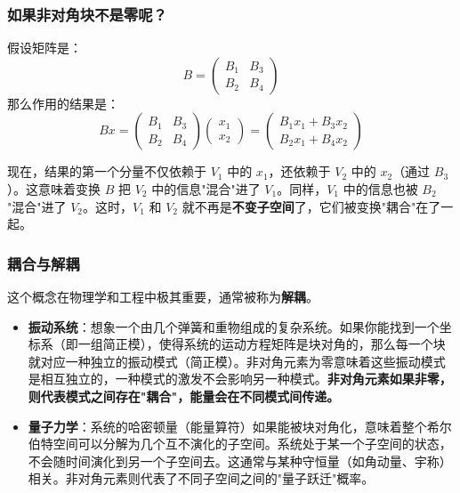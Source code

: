\subsubsection{如果非对角块不是零呢？}
假设矩阵是：
\begin{equation}
	B = \begin{pmatrix}
		B_1 & B_3 \\
		B_2 & B_4
	\end{pmatrix}
\end{equation}
那么作用的结果是：
\begin{equation}
	Bx = \begin{pmatrix}
		B_1 & B_3 \\
		B_2 & B_4
	\end{pmatrix} \begin{pmatrix}
		x_1 \\
		x_2
	\end{pmatrix} = \begin{pmatrix}
		B_1 x_1 + B_3 x_2 \\
		B_2 x_1 + B_4 x_2
	\end{pmatrix}
\end{equation}

现在，结果的第一个分量不仅依赖于 \( V_1 \) 中的 \( x_1 \)，还依赖于 \( V_2 \) 中的 \( x_2 \)（通过 \( B_3 \)）。这意味着变换 \( B \) 把 \( V_2 \) 中的信息"混合"进了 \( V_1 \)。同样，\( V_1 \) 中的信息也被 \( B_2 \) "混合"进了 \( V_2 \)。这时，\( V_1 \) 和 \( V_2 \) 就不再是\textbf{不变子空间}了，它们被变换"耦合"在了一起。

\subsubsection{耦合与解耦}

这个概念在物理学和工程中极其重要，通常被称为\textbf{解耦}。

\begin{itemize}
	\item \textbf{振动系统}：想象一个由几个弹簧和重物组成的复杂系统。如果你能找到一个坐标系（即一组简正模），使得系统的运动方程矩阵是块对角的，那么每一个块就对应一种独立的振动模式（简正模）。非对角元素为零意味着这些振动模式是相互独立的，一种模式的激发不会影响另一种模式。\textbf{非对角元素如果非零，则代表模式之间存在"耦合"，能量会在不同模式间传递。}
	\item \textbf{量子力学}：系统的哈密顿量（能量算符）如果能被块对角化，意味着整个希尔伯特空间可以分解为几个互不演化的子空间。系统处于某一个子空间的状态，不会随时间演化到另一个子空间去。这通常与某种守恒量（如角动量、宇称）相关。非对角元素则代表了不同子空间之间的"量子跃迁"概率。
\end{itemize}

